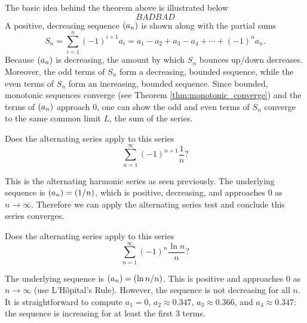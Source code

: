 \documentclass{ximera}
\begin{document}
The basic idea behind the theorem above is illustrated below
\[
BADBAD%
\]
A positive, decreasing sequence $\left( a_n \right)$ is shown along with the
partial sums
\[
S_n = \sum_{i=1}^n(-1)^{i+1}a_i =a_1-a_2+a_3-a_4+\cdots+(-1)^na_n.
\]
Because $\left( a_n \right)$ is decreasing, the amount by which $S_n$ bounces
up/down decreases. Moreover, the odd terms of $S_n$ form a decreasing,
bounded sequence, while the even terms of $S_n$ form an increasing,
bounded sequence. Since bounded, monotonic sequences converge (see
Theorem \ref{thm:monotonic_converge}) and the terms of $\left( a_n \right)$
approach 0, one can show the odd and even terms of $S_n$ converge to
the same common limit $L$, the sum of the
series.

\begin{question}
  Does the alternating series apply to this series
  \[
  \sum_{n=1}^\infty (-1)^{n+1}\frac1n ?
  \]
  \begin{prompt}
    \begin{multipleChoice}
    \end{multipleChoice}
    \begin{feedback}
      This is the alternating harmonic series as seen previously. The
      underlying sequence is $\left( a_n \right) = \left( 1/n \right)$, which is
      positive, decreasing, and approaches 0 as
      $n\to\infty$. Therefore we can apply the alternating series test
      and conclude this series converges.
      
    \end{feedback}
  \end{prompt}
  \begin{question}
    Does the alternating series apply to this series
    \[
    \sum_{n=1}^\infty (-1)^n\frac{\ln n}{n}?
    \]
    \begin{prompt}
      \begin{multipleChoice}
      \end{multipleChoice}
      \begin{feedback}
        The underlying sequence is $\left( a_n \right) = \left( \ln n/n \right)$. This
        is positive and approaches $0$ as $n\to\infty$ (use
        L'H\^opital's Rule). However, the sequence is not decreasing
        for all $n$. It is straightforward to compute $a_1=0$,
        $a_2\approx0.347$, $a_3\approx 0.366$, and $a_4\approx 0.347$:
        the sequence is increasing for at least the first $3$ terms.
      

\end{feedback}
\end{prompt}
\end{question}
\end{question}
\end{document}
